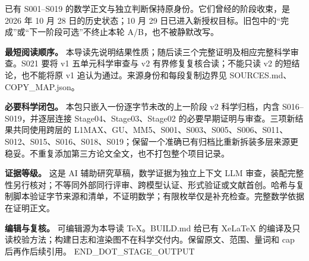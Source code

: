 \documentclass[11pt,a4paper]{article}
\begin{document}
已有 S001--S019 的数学正文与独立判断保持原身份。它们曾经的阶段收束，是 2026 年 10 月 28 日的历史状态；10 月 29 日已进入新授权目标。旧包中的“完成”或“下一阶段可选”不终止本轮 A/B，也不被静默改写。

\textbf{最短阅读顺序。} 本导读先说明结果性质；随后读三个完整证明及相应完整科学审查。S021 要将 v1 五单元科学审查与 v2 有界修复复核合读；不能只读 v2 的短结论，也不能将原 v1 追认为通过。来源身份和每段复制边界见 SOURCES.md、COPY\_MAP.json。

\textbf{必要科学闭包。} 本包只嵌入一份逐字节未改的上一阶段 v2 科学归档，内含 S016--S019，并逐层连接 Stage04、Stage03、Stage02 的必要早期证明与审查。三项新结果共同使用跨层的 L1MAX、GU、MM5、S001、S003、S005、S006、S011、S012、S015、S016、S018、S019；保留一个准确已有归档比重新拆装多层来源更稳妥。不重复添加第三方论文全文，也不打包整个项目记录。

\textbf{证据等级。} 这是 AI 辅助研究草稿，数学证据为独立上下文 LLM 审查，装配完整性另行核对；不等同外部同行评审、跨模型认证、形式验证或文献首创。哈希与复制脚本验证字节来源和清单，不证明数学；有限枚举仅是补充检查。完整数学依据在证明正文。

\textbf{编辑与复核。} 可编辑源为本导读 TeX。BUILD.md 给已有 XeLaTeX 的编译及只读校验方法；构建日志和渲染图不在科学交付内。保留原文、范围、量词和 cap 后再作后续引用。
\vfill
{\small\ttfamily END\_DOT\_STAGE\_OUTPUT}
\end{document}
